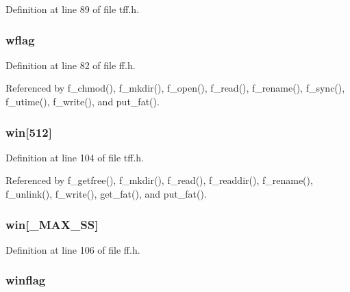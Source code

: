 Definition at line 89 of file tff.\-h.

\hypertarget{struct_f_a_t_f_s_a34eeef694e75229e1608f07acba3ed1c}{
\subsubsection[{wflag}]{ wflag}}\label{struct_f_a_t_f_s_a34eeef694e75229e1608f07acba3ed1c}


Definition at line 82 of file ff.\-h.



Referenced by f\-\_\-chmod(), f\-\_\-mkdir(), f\-\_\-open(), f\-\_\-read(), f\-\_\-rename(), f\-\_\-sync(), f\-\_\-utime(), f\-\_\-write(), and put\-\_\-fat().

\hypertarget{struct_f_a_t_f_s_a54541860d8273ee2709def80ccc3e271}{
\subsubsection[{win}]{ win\mbox{[}512\mbox{]}}}\label{struct_f_a_t_f_s_a54541860d8273ee2709def80ccc3e271}


Definition at line 104 of file tff.\-h.



Referenced by f\-\_\-getfree(), f\-\_\-mkdir(), f\-\_\-read(), f\-\_\-readdir(), f\-\_\-rename(), f\-\_\-unlink(), f\-\_\-write(), get\-\_\-fat(), and put\-\_\-fat().

\hypertarget{struct_f_a_t_f_s_ac25b380b1d1017d57e18ca22be8a1f11}{
\subsubsection[{win}]{ win\mbox{[}{\bf \-\_\-\-M\-A\-X\-\_\-\-S\-S}\mbox{]}}}\label{struct_f_a_t_f_s_ac25b380b1d1017d57e18ca22be8a1f11}


Definition at line 106 of file ff.\-h.

\hypertarget{struct_f_a_t_f_s_ac310e0b372e8ec4195568846746d2f49}{
\subsubsection[{winflag}]{ winflag}}\label{struct_f_a_t_f_s_ac310e0b372e8ec4195568846746d2f49}


